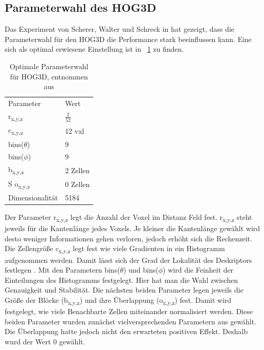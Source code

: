 
\subsection{Parameterwahl des HOG3D}
Das Experiment von Scherer, Walter und Schreck in \cite{scherer2010histograms} hat gezeigt, dass die Parameterwahl für den HOG3D die Performance stark beeinflussen kann. Eine sich als optimal erwiesene Einstellung ist in \figurename~\ref{Parameter} zu finden.

\begin{table}[H]
	\centering
	\caption{Optimale Parameterwahl für HOG3D, entnommen aus \cite{scherer2010histograms}}
	\label{Parameter}
	\begin{tabular}{ll}
		Parameter                & Wert     \\
		r\textsubscript{x,y,z} & $\frac{2}{52}$    \\
		c\textsubscript{x,y,z} & 12 vxl   \\
		bins($ \theta $)       & 9        \\
		bins($ \phi $)         & 9        \\
		b\textsubscript{x,y,z} & 2 Zellen \\S
		o\textsubscript{x,y,z} & 0 Zellen \\
		Dimensionalität          & 5184    
	\end{tabular}
	
\end{table}
Der Parameter r\textsubscript{x,y,z} legt die Anzahl der Voxel im Distanz Feld fest. r\textsubscript{x,y,z} steht jeweils für die Kantenlänge jedes Voxels. Je kleiner die Kantenlänge gewählt wird desto weniger Informationen gehen verloren, jedoch erhöht sich die Rechenzeit. Die Zellengröße c\textsubscript{x,y,z} legt fest wie viele Gradienten in ein Histogramm aufgenommen werden. Damit lässt sich der Grad der Lokalität des Deskriptors festlegen \cite{scherer2010histograms}.
Mit den Parametern 	bins($ \theta $) und bins($ \phi $) wird die Feinheit der Einteilungen des Histogramms festgelegt. Hier hat man die Wahl zwischen Genauigkeit und Stabilität.
Die nächsten beiden Parameter legen jeweils die Größe der Blöcke (b\textsubscript{x,y,z})  und ihre Überlappung  (o\textsubscript{x,y,z}) fest. Damit wird festgelegt, wie viele Benachbarte Zellen miteinander normalisiert werden. Diese beiden Parameter wurden zunächst vielversprechenden Parametern aus \cite{dalal2005histograms} gewählt. Die Überlappung hatte jedoch nicht den erwarteten positiven Effekt. Deshalb wurd der Wert 0 gewählt.


